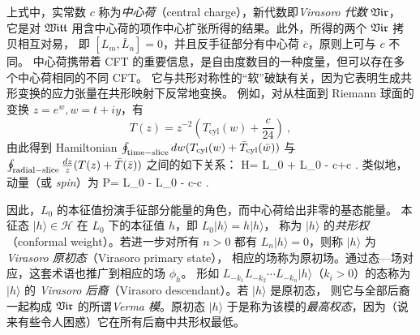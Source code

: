 
上式中，实常数 $c$ 称为\emph{中心荷}（central charge），新代数即\emph{Virasoro 代数} $\mathfrak{Vir}$，
它是对 $\mathfrak{Witt}$ 用含中心荷的项作中心扩张所得的结果。此外，所得的两个 $\mathfrak{Vir}$ 拷贝相互对易，
即 $[L_m,\bar{L}_n]=0$，并且反手征部分有中心荷 $\bar{c}$，原则上可与 $c$ 不同。
中心荷携带着 CFT 的重要信息，是自由度数目的一种度量，但可以存在多个中心荷相同的不同 CFT。
它与共形对称性的“软”破缺有关，因为它表明生成共形变换的应力张量在共形映射下反常地变换。
例如，对从柱面到 Riemann 球面的变换 $z=e^w, w=t+iy$，有
\begin{equation}
T(z)=z^{-2}\left(T_{\text{cyl}}(w)+\frac{c}{24}\right)~, 
\end{equation}
由此得到 Hamiltonian $\oint_{\rm{time-slice}}dw ( T_{\text{cyl}}(w)+ \bar {T}_{\text{cyl}}(\bar w))$
与 $\oint_{\rm{radial-slice}}{dz\over z}( T(z)+ \bar {T}(\bar z)) $ 之间的如下关系：
\be\label{hamiltonian}
H= L_0  +  \tilde L_0 - {c+\tilde c }. 
\ee
类似地，动量（或 {\em spin}）为
\be\label{momentum}
P= L_0  -  \tilde L_0 - {c-\tilde c }. 
\ee


因此，$L_0$ 的本征值扮演手征部分能量的角色，而中心荷给出非零的基态能量。
本征态 $|h\rangle\in\mathcal{H}$ 在 $L_0$ 下的本征值 $h$，即 $L_0|h\rangle=h|h\rangle$，
称为 $|h\rangle$ 的\emph{共形权}（conformal weight）。若进一步对所有 $n>0$ 都有
$L_n|h\rangle=0$，则称 $|h\rangle$ 为\emph{Virasoro 原初态}（Virasoro primary state），
相应的场称为原初场。通过态—场对应，这套术语也推广到相应的场 $\phi_h$。
形如 $L_{-k_1}L_{-k_2}\cdots L_{-k_n}|h\rangle$（$k_i>0$）的态称为 $|h\rangle$ 的
\emph{Virasoro 后裔}（Virasoro descendant）。若 $|h\rangle$ 是原初态，
则它与全部后裔一起构成 $\mathfrak{Vir}$ 的所谓\emph{Verma 模}。原初态 $|h\rangle$
于是称为该模的\emph{最高权态}，因为（说来有些令人困惑）它在所有后裔中共形权最低。

